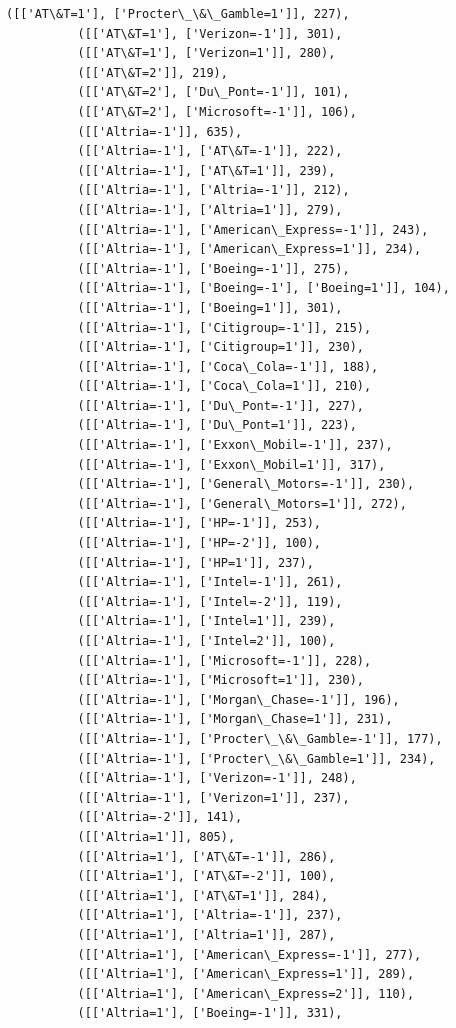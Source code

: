 \documentclass[11pt]{article}
\begin{document}
\begin{Verbatim}[commandchars=\\\{\}]
          ([['AT\&T=1'], ['Procter\_\&\_Gamble=1']], 227),
          ([['AT\&T=1'], ['Verizon=-1']], 301),
          ([['AT\&T=1'], ['Verizon=1']], 280),
          ([['AT\&T=2']], 219),
          ([['AT\&T=2'], ['Du\_Pont=-1']], 101),
          ([['AT\&T=2'], ['Microsoft=-1']], 106),
          ([['Altria=-1']], 635),
          ([['Altria=-1'], ['AT\&T=-1']], 222),
          ([['Altria=-1'], ['AT\&T=1']], 239),
          ([['Altria=-1'], ['Altria=-1']], 212),
          ([['Altria=-1'], ['Altria=1']], 279),
          ([['Altria=-1'], ['American\_Express=-1']], 243),
          ([['Altria=-1'], ['American\_Express=1']], 234),
          ([['Altria=-1'], ['Boeing=-1']], 275),
          ([['Altria=-1'], ['Boeing=-1'], ['Boeing=1']], 104),
          ([['Altria=-1'], ['Boeing=1']], 301),
          ([['Altria=-1'], ['Citigroup=-1']], 215),
          ([['Altria=-1'], ['Citigroup=1']], 230),
          ([['Altria=-1'], ['Coca\_Cola=-1']], 188),
          ([['Altria=-1'], ['Coca\_Cola=1']], 210),
          ([['Altria=-1'], ['Du\_Pont=-1']], 227),
          ([['Altria=-1'], ['Du\_Pont=1']], 223),
          ([['Altria=-1'], ['Exxon\_Mobil=-1']], 237),
          ([['Altria=-1'], ['Exxon\_Mobil=1']], 317),
          ([['Altria=-1'], ['General\_Motors=-1']], 230),
          ([['Altria=-1'], ['General\_Motors=1']], 272),
          ([['Altria=-1'], ['HP=-1']], 253),
          ([['Altria=-1'], ['HP=-2']], 100),
          ([['Altria=-1'], ['HP=1']], 237),
          ([['Altria=-1'], ['Intel=-1']], 261),
          ([['Altria=-1'], ['Intel=-2']], 119),
          ([['Altria=-1'], ['Intel=1']], 239),
          ([['Altria=-1'], ['Intel=2']], 100),
          ([['Altria=-1'], ['Microsoft=-1']], 228),
          ([['Altria=-1'], ['Microsoft=1']], 230),
          ([['Altria=-1'], ['Morgan\_Chase=-1']], 196),
          ([['Altria=-1'], ['Morgan\_Chase=1']], 231),
          ([['Altria=-1'], ['Procter\_\&\_Gamble=-1']], 177),
          ([['Altria=-1'], ['Procter\_\&\_Gamble=1']], 234),
          ([['Altria=-1'], ['Verizon=-1']], 248),
          ([['Altria=-1'], ['Verizon=1']], 237),
          ([['Altria=-2']], 141),
          ([['Altria=1']], 805),
          ([['Altria=1'], ['AT\&T=-1']], 286),
          ([['Altria=1'], ['AT\&T=-2']], 100),
          ([['Altria=1'], ['AT\&T=1']], 284),
          ([['Altria=1'], ['Altria=-1']], 237),
          ([['Altria=1'], ['Altria=1']], 287),
          ([['Altria=1'], ['American\_Express=-1']], 277),
          ([['Altria=1'], ['American\_Express=1']], 289),
          ([['Altria=1'], ['American\_Express=2']], 110),
          ([['Altria=1'], ['Boeing=-1']], 331),

\end{Verbatim}
\end{document}
